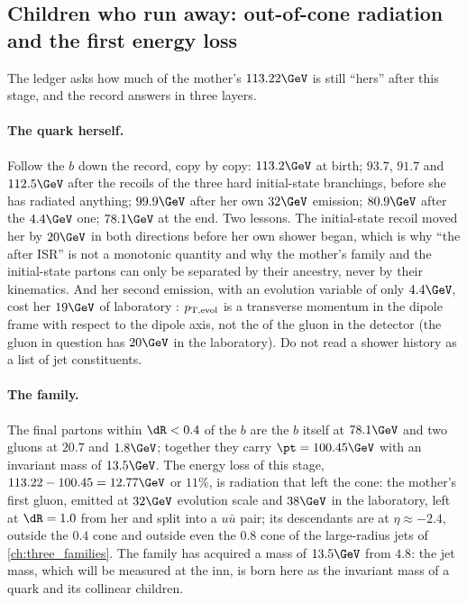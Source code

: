 \subsection{Children who run away: out-of-cone radiation and the first energy loss}
\label{sec:mother_gives_birth:runaways}

The ledger asks how much of the mother's $113.22\GeV$ is still ``hers''
after this stage, and the record answers in three layers.

\paragraph{The quark herself.} Follow the $b$ down the record, copy by copy:
$113.2\GeV$ at birth; $93.7$, $91.7$ and $112.5\GeV$ after the recoils of
the three hard initial-state branchings, before she has radiated anything;
$99.9\GeV$ after her own $32\GeV$ emission; $80.9\GeV$ after the $4.4\GeV$
one; $78.1\GeV$ at the end. Two lessons. The initial-state recoil moved her
by $20\GeV$ in both directions before her own shower began, which is why
``the \pt after ISR'' is not a monotonic quantity and why the mother's
family and the initial-state partons can only be separated by their
ancestry, never by their kinematics. And her second emission, with an
evolution variable of only $4.4\GeV$, cost her $19\GeV$ of laboratory \pt:
$p_{\mathrm{T,evol}}$ is a transverse momentum in the dipole frame with
respect to the dipole axis, not the \pt of the gluon in the detector (the
gluon in question has $20\GeV$ in the laboratory). Do not read a shower
history as a list of jet constituents.

\paragraph{The family.} The final partons within $\dR<0.4$ of the $b$ are
the $b$ itself at $78.1\GeV$ and two gluons at $20.7$ and $1.8\GeV$;
together they carry $\pt=100.45\GeV$ with an invariant mass of
$13.5\GeV$. The energy loss of this stage, $113.22-100.45=12.77\GeV$ or
$11\%$, is radiation that left the cone: the mother's first gluon, emitted
at $32\GeV$ evolution scale and $38\GeV$ in the laboratory, left at
$\dR=1.0$ from her and split into a $u\bar u$ pair; its descendants are at
$\eta\approx-2.4$, outside the $0.4$ cone and outside even the $0.8$ cone
of the large-radius jets of \cref{ch:three_families}. The family has acquired a mass of $13.5\GeV$ from $4.8$: the
jet mass, which will be measured at the inn, is born here as the invariant
mass of a quark and its collinear children.

